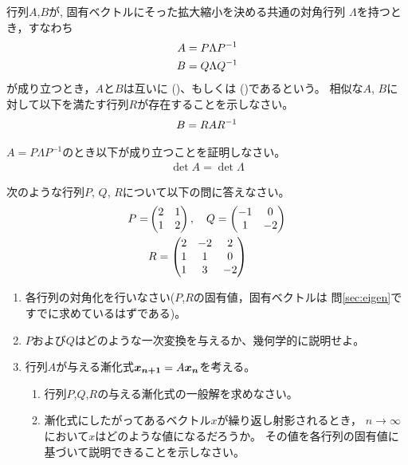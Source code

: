 \documentclass[twocolumn,11pt]{jarticle}
\begin{document}
\nquestion
行列$A$,$B$が, 固有ベクトルにそった拡大縮小を決める共通の対角行列
$\Lambda$を持つとき，すなわち
\begin{align}
  A&=P\Lambda P^{-1}\notag\\
  B&=Q\Lambda Q^{-1}\notag
\end{align}
が成り立つとき，$A$と$B$は互いに
()、もしくは
()であるという。
相似な$A$, $B$に対して以下を満たす行列$R$が存在することを示しなさい。
\begin{align}
  B=RA R^{-1}\notag
\end{align}

\nquestion
$A=P\Lambda P^{-1}$のとき以下が成り立つことを証明しなさい。
\begin{align}
  \det A=\det \Lambda
\end{align}

\exercise
次のような行列$P$, $Q$, $R$について以下の問に答えなさい。
\begin{align}
P=&\begin{pmatrix} 2 & 1\\1 & 2
  \end{pmatrix},
\quad 
Q=\begin{pmatrix} -1 & 0\\1 & -2
  \end{pmatrix}
\notag\\
&R=\begin{pmatrix} 2 & -2 & 2\\1 & 1 & 0\\1 & 3 & -2
  \end{pmatrix}\notag
\end{align}
\begin{enumerate}
\item 各行列の対角化を行いなさい($P$,$R$の固有値，固有ベクトルは
  問\ref{sec:eigen}ですでに求めているはずである)。
\item $P$および$Q$はどのような一次変換を与えるか、幾何学的に説明せよ。
\item 行列$A$が与える漸化式$\boldsymbol{x_{n+1}}=A\boldsymbol{x_{n}}$を考える。
  \begin{enumerate}
  \item 行列$P$,$Q$,$R$の与える漸化式の一般解を求めなさい。
  \item 漸化式にしたがってあるベクトル$x$が繰り返し射影されるとき，
  $n\to\infty$において$x$はどのような値になるだろうか。
  その値を各行列の固有値に基づいて説明できることを示しなさい。
  \end{enumerate}
\end{enumerate}
\end{document}

